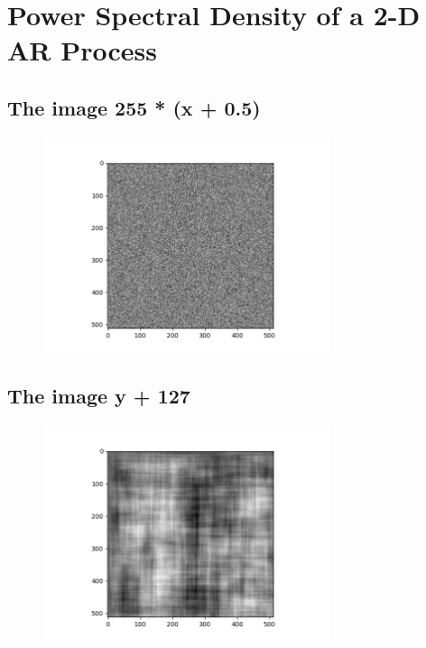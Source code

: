 \documentclass{article}
\begin{document}
\section{Power Spectral Density of a 2-D AR Process}
\subsection{The image 255 * (x + 0.5)}
\begin{figure}[H]
    \centering
    \includegraphics[width=0.75\textwidth]{../images/np-rand-uniform.png}
    \begin{center}
    \end{center}
\end{figure}
\subsection{The image y + 127}
\begin{figure}[H]
    \centering
    \includegraphics[width=0.75\textwidth]{../images/image-p-127.png}
    \begin{center}
    \end{center}
\end{figure}
\end{document}
